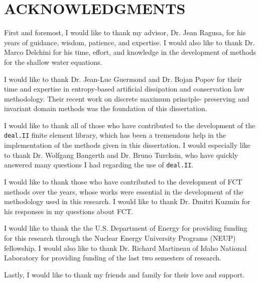 \chapter*{ACKNOWLEDGMENTS}

\indent
First and foremost, I would like to thank my advisor, Dr. Jean Ragusa,
for his years of guidance, wisdom, patience, and expertise. I would also like to
thank Dr. Marco Delchini for his time, effort, and
knowledge in the development of methods for the shallow water equations.

I would like to thank Dr. Jean-Luc Guermond and Dr. Bojan Popov for their
time and expertise in entropy-based artificial dissipation and
conservation law methodology. Their recent work on discrete maximum principle-
preserving and invariant domain methods was the foundation of this dissertation.

I would like to thank all of those who have contributed to the
development of the \texttt{deal.II} finite element library, which has been
a tremendous help in the implementation of the methods given in this
dissertation. I would especially like to thank Dr. Wolfgang Bangerth
and Dr. Bruno Turcksin, who have quickly answered many questions I had regarding
the use of \texttt{deal.II}.

I would like to thank those who have contributed to the development
of FCT methods over the years, whose works were essential in the development
of the methodology used in this research. I would like to thank Dr. Dmitri Kuzmin
for his responses in my questions about FCT.

I would like to thank the the U.S. Department of Energy for providing
funding for this research through the Nuclear Energy University
Programs (NEUP) fellowship. I would also like to thank Dr. Richard
Martineau of Idaho National Laboratory for providing funding of
the last two semesters of research.

Lastly, I would like to thank my friends and family for their love and support.

\pagebreak{}
